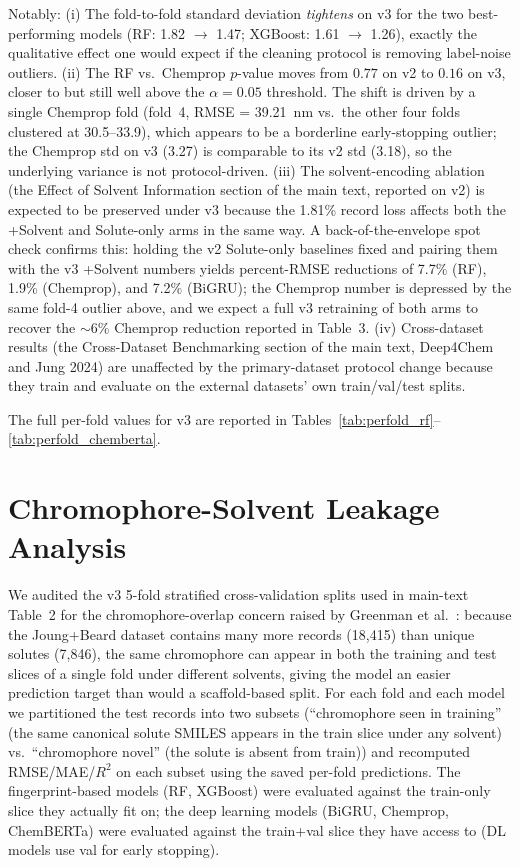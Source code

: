 \documentclass[journal=jcisd8,manuscript=suppinfo]{achemso}
\begin{document}
Notably:
(i) The fold-to-fold standard deviation \emph{tightens} on v3 for the two best-performing models (RF: 1.82 $\to$ 1.47; XGBoost: 1.61 $\to$ 1.26), exactly the qualitative effect one would expect if the cleaning protocol is removing label-noise outliers.
(ii) The RF vs.\ Chemprop $p$-value moves from $0.77$ on v2 to $0.16$ on v3, closer to but still well above the $\alpha = 0.05$ threshold. The shift is driven by a single Chemprop fold (fold~4, RMSE = 39.21~nm vs.\ the other four folds clustered at 30.5--33.9), which appears to be a borderline early-stopping outlier; the Chemprop std on v3 (3.27) is comparable to its v2 std (3.18), so the underlying variance is not protocol-driven.
(iii) The solvent-encoding ablation (the Effect of Solvent Information section of the main text, reported on v2) is expected to be preserved under v3 because the 1.81\% record loss affects both the +Solvent and Solute-only arms in the same way. A back-of-the-envelope spot check confirms this: holding the v2 Solute-only baselines fixed and pairing them with the v3 +Solvent numbers yields percent-RMSE reductions of 7.7\% (RF), 1.9\% (Chemprop), and 7.2\% (BiGRU); the Chemprop number is depressed by the same fold-4 outlier above, and we expect a full v3 retraining of both arms to recover the $\sim$6\% Chemprop reduction reported in Table~3.
(iv) Cross-dataset results (the Cross-Dataset Benchmarking section of the main text, Deep4Chem and Jung 2024) are unaffected by the primary-dataset protocol change because they train and evaluate on the external datasets' own train/val/test splits.

The full per-fold values for v3 are reported in Tables~\ref{tab:perfold_rf}--\ref{tab:perfold_chemberta}.


\section{Chromophore-Solvent Leakage Analysis}
\label{si:chromophore_leakage}

We audited the v3 5-fold stratified cross-validation splits used in main-text Table~2 for the chromophore-overlap concern raised by Greenman et al.~\cite{greenman2022multifidelity}: because the Joung+Beard dataset contains many more records (18{,}415) than unique solutes (7{,}846), the same chromophore can appear in both the training and test slices of a single fold under different solvents, giving the model an easier prediction target than would a scaffold-based split. For each fold and each model we partitioned the test records into two subsets (``chromophore seen in training'' (the same canonical solute SMILES appears in the train slice under any solvent) vs.\ ``chromophore novel'' (the solute is absent from train)) and recomputed RMSE/MAE/$R^2$ on each subset using the saved per-fold predictions. The fingerprint-based models (RF, XGBoost) were evaluated against the train-only slice they actually fit on; the deep learning models (BiGRU, Chemprop, ChemBERTa) were evaluated against the train+val slice they have access to (DL models use val for early stopping).
\end{document}
